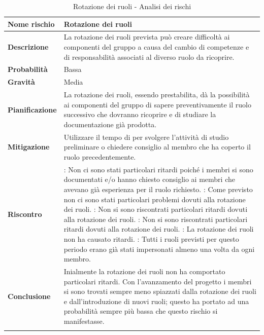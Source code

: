\documentclass[12pt,a4paper]{article}
\begin{document}
\begin{center}
	\begin{longtable}[H]{p{} p{}}
		\toprule
		\textbf{Nome rischio} & \textbf{Rotazione dei ruoli} \\*
		\midrule
		\midrule
		\textbf{Descrizione} & La rotazione dei ruoli prevista può creare difficoltà ai 
            componenti del gruppo a causa del cambio di competenze e di responsabilità 
            associati al diverso ruolo da ricoprire. \\*
		\midrule
		\textbf{Probabilità} & Bassa \\*
		\midrule
		\textbf{Gravità} & Media \\*
		\midrule
		\textbf{Pianificazione} &  La rotazione dei ruoli, essendo prestabilita, dà la possibilità ai componenti del gruppo di sapere preventivamente il ruolo successivo che dovranno ricoprire e di studiare la documentazione già prodotta. \\*
		\midrule
		\textbf{Mitigazione} & Utilizzare il tempo di \mgls{slack} per svolgere l'attività di studio preliminare o chiedere consiglio al membro che ha coperto il ruolo precedentemente. \\*
        \midrule
        \textbf{Riscontro} & 
            \textbf{\FA{}}: Non ci sono stati particolari ritardi poiché i membri si sono documentati 
                e/o hanno chiesto consiglio ai membri che avevano già esperienza per il ruolo richiesto. \newline
            \textbf{\FAD{}}: Come previsto non ci sono stati particolari problemi dovuti alla rotazione
                dei ruoli. \newline
            \textbf{\FPA{}}: Non si sono riscontrati particolari ritardi dovuti alla rotazione dei ruoli. \newline
            \textbf{\FPD{}}: Non si sono riscontrati particolari ritardi dovuti alla rotazione dei ruoli. \newline
            \textbf{\FC{}}: La rotazione dei ruoli non ha causato ritardi. \newline
            \textbf{\FVV{}}: Tutti i ruoli previsti per questo periodo erano già stati impersonati almeno una volta da ogni membro. \\*
        \midrule
        \textbf{Conclusione} & Inialmente la rotazione dei ruoli non ha comportato particolari ritardi. Con l'avanzamento del progetto i membri si sono trovati sempre meno spiazzati dalla rotazione dei ruoli e dall'introduzione di nuovi ruoli; questo ha portato ad una probabilità sempre più bassa che questo rischio si manifestasse. \\*
		\bottomrule
		\caption{Rotazione dei ruoli - Analisi dei rischi}
	\end{longtable}
\end{center}
\end{document}
